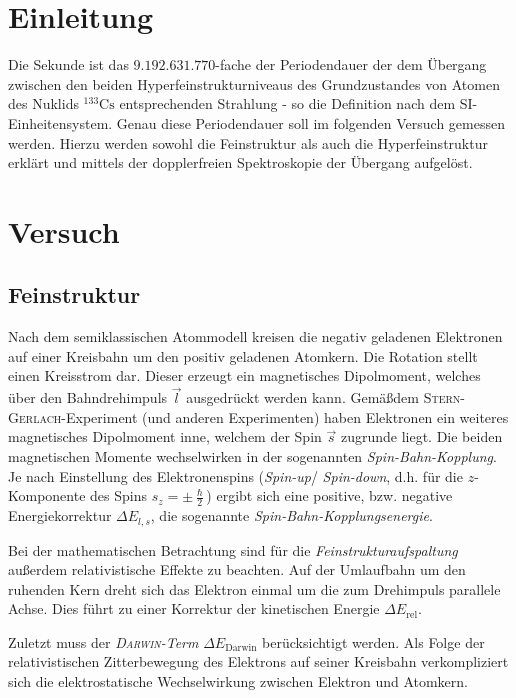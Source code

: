 \documentclass[../bericht.tex]{subfiles}
\begin{document}
  \chapter{Einleitung}

    Die Sekunde ist das $9.192.631.770$-fache der Periodendauer der dem \"Ubergang zwischen den beiden Hyperfeinstrukturniveaus des Grundzustandes von Atomen des Nuklids $\mathrm{^{133}Cs}$ entsprechenden Strahlung - so die Definition nach dem SI-Einheitensystem. Genau diese Periodendauer soll im folgenden Versuch gemessen werden. Hierzu werden sowohl die Feinstruktur als auch die Hyperfeinstruktur erkl\"art und mittels der dopplerfreien Spektroskopie der \"Ubergang aufgel\"ost.


  \chapter{Versuch}

    \section{Feinstruktur}
    \label{sec:feinstruktur}

      Nach dem semiklassischen Atommodell kreisen die negativ geladenen Elektronen auf einer Kreisbahn um den positiv geladenen Atomkern. Die Rotation stellt einen Kreisstrom dar. Dieser erzeugt ein magnetisches Dipolmoment, welches \"uber den Bahndrehimpuls $\vec{l}$ ausgedr\"uckt werden kann. Gem\"a\ss dem \textsc{Stern-Gerlach}-Experiment (und anderen Experimenten) haben Elektronen ein weiteres magnetisches Dipolmoment inne, welchem der Spin $\vec{s}$ zugrunde liegt. Die beiden magnetischen Momente wechselwirken in der sogenannten \textit{Spin-Bahn-Kopplung}. Je nach Einstellung des Elektronenspins (\textit{Spin-up}/ \textit{Spin-down}, d.h. f\"ur die $z$-Komponente des Spins $s_z=\pm \frac{\hslash}{2}$) ergibt sich eine positive, bzw. negative Energiekorrektur $\Delta E_{l,s}$, die sogenannte \textit{Spin-Bahn-Kopplungsenergie}.

      Bei der mathematischen Betrachtung sind f\"ur die \textit{Feinstrukturaufspaltung} au\ss{}erdem relativistische Effekte zu beachten. Auf der Umlaufbahn um den ruhenden Kern dreht sich das Elektron einmal um die zum Drehimpuls parallele Achse. Dies f\"uhrt zu einer Korrektur der kinetischen Energie $\Delta E_\mathrm{rel}$.

      Zuletzt muss der \textit{\textsc{Darwin}-Term} $\Delta E_\mathrm{Darwin}$ ber\"ucksichtigt werden. Als Folge der relativistischen Zitterbewegung des Elektrons auf seiner Kreisbahn verkompliziert sich die elektrostatische Wechselwirkung zwischen Elektron und Atomkern.
      \medskip
\end{document}
